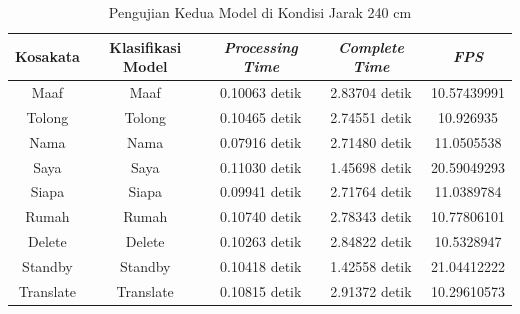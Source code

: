 \newpage
\begin{longtable}{|c|c|c|c|c|}
  \caption{Pengujian Kedua Model di Kondisi Jarak 240 cm}
  \label{tb:prediksitengah2}                                   \\
  \hline
  \rowcolor[HTML]{C0C0C0}
  \textbf{Kosakata} & \textbf{Klasifikasi Model} & \textbf{\emph{Processing Time}} & \textbf{\emph{Complete Time}} & \textbf{\emph{FPS}}\\
  \hline
  Maaf              & Maaf                          & 0.10063 detik                           & 2.83704 detik                                  & 10.57439991\\
  Tolong            & Tolong                        & 0.10465 detik                           & 2.74551 detik                                  & 10.926935\\
  Nama              & Nama                          & 0.07916 detik                           & 2.71480 detik                                  & 11.0505538\\
  Saya              & Saya                          & 0.11030 detik                           & 1.45698 detik                                  & 20.59049293\\
  Siapa             & Siapa                         & 0.09941 detik                           & 2.71764 detik                                  & 11.0389784\\
  Rumah             & Rumah                         & 0.10740 detik                           & 2.78343 detik                                  & 10.77806101\\
  Delete            & Delete                        & 0.10263 detik                           & 2.84822 detik                                  & 10.5328947\\
  Standby           & Standby                       & 0.10418 detik                           & 1.42558 detik                                  & 21.04412222\\
  Translate         & Translate                     & 0.10815 detik                           & 2.91372 detik                                  & 10.29610573\\
  \hline
\end{longtable}




